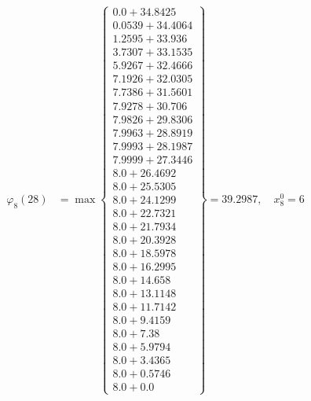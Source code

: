 \documentclass{article}
\begin{document}
\begin{align*}
  
\varphi_{8}(28) &= \max \left\{ \begin{array}{c}
0.0 + 34.8425 \\
 0.0539 + 34.4064 \\
 1.2595 + 33.936 \\
 3.7307 + 33.1535 \\
 5.9267 + 32.4666 \\
 7.1926 + 32.0305 \\
 7.7386 + 31.5601 \\
 7.9278 + 30.706 \\
 7.9826 + 29.8306 \\
 7.9963 + 28.8919 \\
 7.9993 + 28.1987 \\
 7.9999 + 27.3446 \\
 8.0 + 26.4692 \\
 8.0 + 25.5305 \\
 8.0 + 24.1299 \\
 8.0 + 22.7321 \\
 8.0 + 21.7934 \\
 8.0 + 20.3928 \\
 8.0 + 18.5978 \\
 8.0 + 16.2995 \\
 8.0 + 14.658 \\
 8.0 + 13.1148 \\
 8.0 + 11.7142 \\
 8.0 + 9.4159 \\
 8.0 + 7.38 \\
 8.0 + 5.9794 \\
 8.0 + 3.4365 \\
 8.0 + 0.5746 \\
 8.0 + 0.0
\end{array} \right\}=39.2987,\quad x_{8}^0=6\\
  
  
  

\end{align*}
\end{document}
